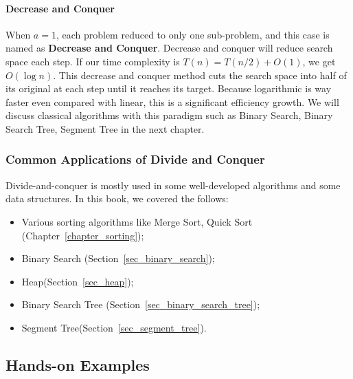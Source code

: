 \documentclass[../main.tex]{subfiles}
\begin{document}
\paragraph{Decrease and Conquer}
When $a=1$,  each problem reduced to only one sub-problem, and this case is named as \textbf{Decrease and Conquer}. Decrease and conquer will reduce search space each step. If our time complexity is $T(n) = T(n/2)+O(1)$, we get $O(\log n)$. This decrease and conquer method cuts the search space into half of its original at each step until it reaches its target. Because logarithmic is way faster even compared with linear, this is a significant efficiency growth. We will discuss classical algorithms with this paradigm such as Binary Search, Binary Search Tree, Segment Tree in the next chapter. 
\subsubsection{Common  Applications of Divide and Conquer}
 Divide-and-conquer is mostly used in some well-developed algorithms and some data structures. In this book, we covered the follows:
\begin{itemize}
    \item Various sorting algorithms like Merge Sort, Quick Sort (Chapter~\ref{chapter_sorting});
    \item Binary Search (Section~\ref{sec_binary_search});
    \item Heap(Section~\ref{sec_heap});
    \item Binary Search Tree (Section~\ref{sec_binary_search_tree});
    \item Segment Tree(Section~\ref{sec_segment_tree}).
\end{itemize}
    
    
\subsection{Hands-on Examples}
\end{document}
